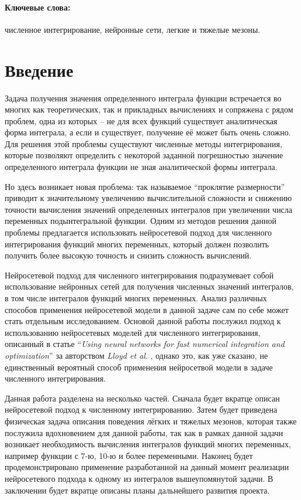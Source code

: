 \documentclass[a4paper,12pt]{article} %
\begin{document}
\paragraph{Ключевые слова:}численное интегрирование, нейронные сети, легкие и тяжелые мезоны.

\section{Введение}

Задача получения значения определенного интеграла функции встречается во многих как теоретических, так и прикладных вычислениях и сопряжена с рядом проблем, одна из которых -- не для всех функций существует аналитическая форма интеграла, а если и существует, получение её может быть очень сложно. Для решения этой проблемы существуют численные методы интегрирования, которые позволяют определить с некоторой заданной погрешностью значение определенного интеграла функции не зная аналитической формы интеграла.

Но здесь возникает новая проблема: так называемое \enquote{проклятие размерности} приводит к значительному увеличению вычислительной сложности и снижению точности вычисления значений определенных интегралов при увеличении числа переменных подынтегральной функции. Одним из методов решения данной проблемы предлагается использовать нейросетевой подход для численного интегрирования функций многих переменных, который должен позволить получить более высокую точность и снизить сложность вычислений. 

Нейросетевой подход для численного интегрирования подразумевает собой использование нейронных сетей для получения численных значений интегралов, в том числе интегралов функций многих переменных. Анализ различных способов применения нейросетевой модели в данной задаче сам по себе может стать отдельным исследованием. Основой данной работы послужил подход к использованию нейросетевых моделей для численного интегрирования, описанный в статье \enquote{\textit{Using neural networks for fast numerical integration and optimization}} за авторством \textit{Lloyd et al}. \cite{lloyd2020using}, однако это, как уже сказано, не единственный вероятный способ применения нейросетвой модели в задаче численного интегрирования.

Данная работа разделена на несколько частей. Сначала будет вкратце описан нейросетевой подход к численному интегрированию. Затем будет приведена физическая задача описания поведения лёгких и тяжелых мезонов, которая также послужила вдохновением для данной работы, так как в рамках данной задачи возникает необходимость вычисления интегралов функций многих переменных, например функции с 7-ю, 10-ю и более переменными. Наконец будет продемонстрировано применение разработанной на данный момент реализации нейросетевого подхода к одному из интегралов вышеупомянутой задачи. В заключении будет вкратце описаны планы дальнейшего развития проекта.
\end{document}
